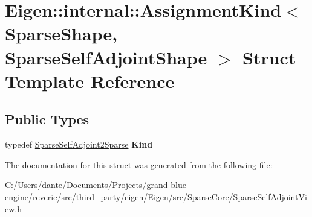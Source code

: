 \hypertarget{struct_eigen_1_1internal_1_1_assignment_kind_3_01_sparse_shape_00_01_sparse_self_adjoint_shape_01_4}{}\section{Eigen\+::internal\+::Assignment\+Kind$<$ Sparse\+Shape, Sparse\+Self\+Adjoint\+Shape $>$ Struct Template Reference}
\label{struct_eigen_1_1internal_1_1_assignment_kind_3_01_sparse_shape_00_01_sparse_self_adjoint_shape_01_4}
\subsection*{Public Types}
\begin{DoxyCompactItemize}
\item 
\mbox{\label{struct_eigen_1_1internal_1_1_assignment_kind_3_01_sparse_shape_00_01_sparse_self_adjoint_shape_01_4_a292d40f0abb62123012cc833d536d1d7}} 
typedef \mbox{\hyperlink{struct_eigen_1_1internal_1_1_sparse_self_adjoint2_sparse}{Sparse\+Self\+Adjoint2\+Sparse}} {\bfseries Kind}
\end{DoxyCompactItemize}


The documentation for this struct was generated from the following file\+:\begin{DoxyCompactItemize}
\item 
C\+:/\+Users/dante/\+Documents/\+Projects/grand-\/blue-\/engine/reverie/src/third\+\_\+party/eigen/\+Eigen/src/\+Sparse\+Core/Sparse\+Self\+Adjoint\+View.\+h\end{DoxyCompactItemize}
